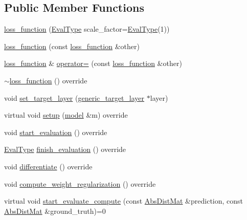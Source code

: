 \subsection*{Public Member Functions}
\begin{DoxyCompactItemize}
\item 
\hyperlink{classlbann_1_1loss__function_a0c5745e661c59e3e5496888d233c07cf}{loss\+\_\+function} (\hyperlink{base_8hpp_a3266f5ac18504bbadea983c109566867}{Eval\+Type} scale\+\_\+factor=\hyperlink{base_8hpp_a3266f5ac18504bbadea983c109566867}{Eval\+Type}(1))
\item 
\hyperlink{classlbann_1_1loss__function_aaebcff849004392decc9850c4c75ead5}{loss\+\_\+function} (const \hyperlink{classlbann_1_1loss__function}{loss\+\_\+function} \&other)
\item 
\hyperlink{classlbann_1_1loss__function}{loss\+\_\+function} \& \hyperlink{classlbann_1_1loss__function_ab882c642619ea4285b61e735d84e401c}{operator=} (const \hyperlink{classlbann_1_1loss__function}{loss\+\_\+function} \&other)
\item 
\hyperlink{classlbann_1_1loss__function_a21c59d9c3db798c330ff8297f6374747}{$\sim$loss\+\_\+function} () override
\item 
void \hyperlink{classlbann_1_1loss__function_a9ef5356468c892c2c0221f8acd6b5471}{set\+\_\+target\+\_\+layer} (\hyperlink{classlbann_1_1generic__target__layer}{generic\+\_\+target\+\_\+layer} $\ast$layer)
\item 
virtual void \hyperlink{classlbann_1_1loss__function_a17a3629e8519c4215ad776a0c7b522ae}{setup} (\hyperlink{classlbann_1_1model}{model} \&m) override
\item 
void \hyperlink{classlbann_1_1loss__function_a90f4126b0b4d47838ef3cc154c6d9705}{start\+\_\+evaluation} () override
\item 
\hyperlink{base_8hpp_a3266f5ac18504bbadea983c109566867}{Eval\+Type} \hyperlink{classlbann_1_1loss__function_a5264d3e71125b7ce8694f73bf25662f7}{finish\+\_\+evaluation} () override
\item 
void \hyperlink{classlbann_1_1loss__function_adbd03ef952ee1055e3dd98f06d33324f}{differentiate} () override
\item 
void \hyperlink{classlbann_1_1loss__function_acd6e3bdcf33235208db03ab7af88e961}{compute\+\_\+weight\+\_\+regularization} () override
\item 
virtual void \hyperlink{classlbann_1_1loss__function_a0bbe41060d788dc7a29f3737761a6f7d}{start\+\_\+evaluate\+\_\+compute} (const \hyperlink{base_8hpp_a9a697a504ae84010e7439ffec862b470}{Abs\+Dist\+Mat} \&prediction, const \hyperlink{base_8hpp_a9a697a504ae84010e7439ffec862b470}{Abs\+Dist\+Mat} \&ground\+\_\+truth)=0

\end{DoxyCompactItemize}
